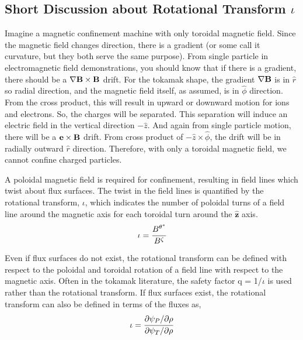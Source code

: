 \subsection{Short Discussion about Rotational Transform $\iota$}
Imagine a magnetic confinement machine with only toroidal magnetic field. Since the magnetic field changes direction, there is a gradient (or some call it curvature, but they both serve the same purpose). From single particle in electromagnetic field demonstrations, you should know that if there is a gradient, there should be a $\nabla \mathbf{B} \times \mathbf{B}$ drift. For the tokamak shape, the gradient $\nabla \mathbf{B}$ is in $\hat{r}$ so radial direction, and the magnetic field itself, as assumed, is in $\hat{\phi}$ direction. From the cross product, this will result in upward or downward motion for ions and electrons. So, the charges will be separated. This separation will induce an electric field in the vertical direction $-\hat{z}$. And again from single particle motion, there will be a $\mathbf{e}\times \mathbf{B}$ drift. From cross product of $-\hat{z} \times \hat{\phi}$, the drift will be in radially outward $\hat{r}$ direction. Therefore, with only a toroidal magnetic field, we cannot confine charged particles.

A poloidal magnetic field is required for confinement, resulting in field lines which twist about flux surfaces. The twist in the field lines is quantified by the rotational transform, $\iota$, which indicates the number of poloidal turns of a field line around the magnetic axis for each toroidal turn around the $\hat{\textbf{z}}$ axis.
\begin{equation}
     \iota = \cfrac{B^{\theta^*}}{B^{\zeta}}
\end{equation}

Even if flux surfaces do not exist, the rotational transform can be defined with respect to the poloidal and toroidal rotation of a field line with respect to the magnetic axis. Often in the tokamak literature, the safety factor q = 1/$\iota$ is used rather than the rotational transform. If flux surfaces exist, the rotational transform can also be defined in terms of the fluxes as,
\begin{equation}
    \iota = \cfrac{\partial\psi_P/\partial\rho}{\partial\psi_T/\partial\rho}
\end{equation}

